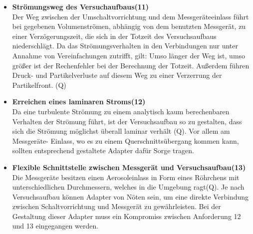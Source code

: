 \begin{itemize}
\item \textbf{Str\"{o}mungsweg des Versuchaufbaus(11)}\\ 
Der Weg zwischen der Umschaltvorrichtung und dem Messger\"{a}teeinlass f\"{u}hrt bei gegebenen Volumenstr\"{o}men, abh\"{a}ngig von dem benutzten Messger\"{a}t, zu einer Verz\"{o}gerungszeit, die sich in der Totzeit des Versuchsaufbaus niederschl\"{a}gt. Da das Str\"{o}mungsverhalten in den Verbindungen nur unter Annahme von Vereinfachungen zutrifft, gilt: Umso l\"{a}nger der Weg ist, umso gr\"{o}{\ss}er ist der Rechenfehler bei der Berechnung der Totzeit. Au{\ss}erdem f\"{u}hren Druck- und Partikelverluste auf diesem Weg zu einer Verzerrung der Partikelfront. (Q)

\item \textbf{Erreichen eines laminaren Stroms(12)}\\ 
Da eine turbulente Str\"{o}mung zu einem analytisch kaum berechenbaren Verhalten der Str\"{o}mung f\"{u}hrt, ist der Versuchsaufbau so zu gestalten, dass sich die Str\"{o}mung m\"{o}glichst \"{u}berall laminar verh\"{a}lt (Q). Vor allem am Messger\"{a}te- Einlass, wo es zu einem Querschnitts\"{u}bergang kommen kann, sollten entsprechend gestaltete Adapter daf\"{u}r Sorge tragen.

\item\textbf{Flexible Schnittstelle zwischen Messger\"{a}t und Versuchsaufbau(13)}\\ 
Die Messger\"{a}te besitzen einen Aerosoleinlass in Form eines R\"{o}hrchens mit unterschiedlichen Durchmessern, welches in die Umgebung ragt(Q). Je nach Versuchsaufbau k\"{o}nnen Adapter von N\"{o}ten sein, um eine direkte Verbindung zwischen Schaltvorrichtung und Messger\"{a}t zu gew\"{a}hrleisten. Bei der Gestaltung dieser Adapter muss ein Kompromiss zwischen Anforderung 12 und 13 eingegangen werden.
\end{itemize}

